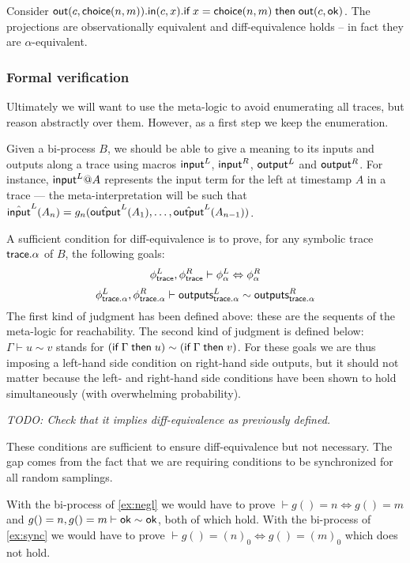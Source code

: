 \begin{example} \label{ex:problem}
  Consider $\mathsf{out}(c,\mathsf{choice}(n,m)).
  \mathsf{in}(c,x).
  \textsf{if}\; x=\mathsf{choice}(n,m) \;\textsf{then}\; \mathsf{out}(c,\mathsf{ok})$.
  The projections are observationally equivalent and diff-equivalence
  holds -- in fact they are $\alpha$-equivalent.
\end{example}

\subsubsection{Formal verification}

Ultimately we will want to use the meta-logic to avoid enumerating all
traces, but reason abstractly over them. However, as a first step we
keep the enumeration.

Given a bi-process $B$, we should be able to give a meaning to its inputs
and outputs along a trace using macros $\textsf{input}^L$, $\textsf{input}^R$, $\textsf{output}^L$
and $\textsf{output}^R$. For instance, $\textsf{input}^L@A$ represents the input term for
the left at timestamp $A$ in a trace --- the meta-interpretation will
be such that
$\hat{\textsf{input}}^L(A_n) = g_n(\hat{\textsf{output}}^L(A_1),\ldots,\hat{\textsf{output}}^L(A_{n-1}))$.

A sufficient condition for diff-equivalence is to prove,
for any symbolic trace $\textsf{trace}.\alpha$ of $B$, the following goals:
$$ \phi^L_{\textsf{trace}}, \phi^R_{\textsf{trace}} \vdash \phi^L_\alpha \Leftrightarrow \phi^R_\alpha $$
$$ \phi^L_{\textsf{trace}.\alpha}, \phi^R_{\textsf{trace}.\alpha} \vdash 
   \textsf{outputs}_{\textsf{trace}.\alpha}^L \sim \textsf{outputs}_{\textsf{trace}.\alpha}^R $$
The first kind of judgment has been defined above: these are the sequents
of the meta-logic for reachability. The second kind of judgment is defined
below: $\Gamma \vdash u \sim v$ stands for $(\textsf{if}\; \Gamma \;\textsf{then}\; u) \sim
(\textsf{if}\; \Gamma \;\textsf{then}\; v)$. For these goals we are thus imposing a left-hand
side condition on right-hand side outputs, but it should not matter because
the left- and right-hand side conditions have been shown to hold 
simultaneously (with overwhelming probability).

\emph{TODO: Check that it implies diff-equivalence as previously defined.}

These conditions are sufficient to ensure diff-equivalence but not necessary.
The gap comes from the fact that we are requiring conditions to be 
synchronized for all random samplings.

\begin{example}
  With the bi-process of \cref{ex:negl} we would have to prove
  $\vdash g() = n \Leftrightarrow g() = m$ and
  $g()=n, g()=m \vdash \mathsf{ok} \sim \mathsf{ok}$, both of which hold.
  With the bi-process of \cref{ex:sync} we would have to prove
  $\vdash g() = (n)_0 \Leftrightarrow g() = (m)_0$ which does not hold.
\end{example}

